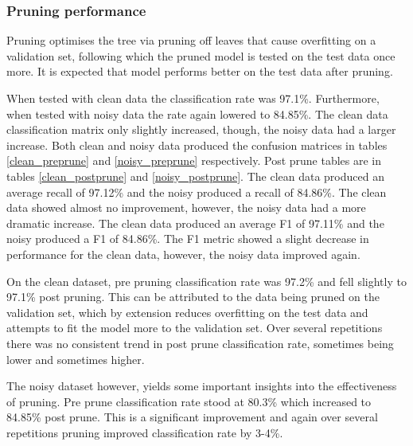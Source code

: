 \documentclass{article}
\begin{document}
\subsubsection{Pruning performance}

Pruning optimises the tree via pruning off leaves that cause overfitting on a validation set, following which the pruned model is tested on the test data once more. It is expected that model performs better on the test data after pruning.

When tested with clean data the classification rate was 97.1\%. Furthermore, when tested with noisy data the rate again lowered to 84.85\%. The clean data classification matrix only slightly increased, though, the noisy data had a larger increase. Both clean and noisy data produced the confusion matrices in tables \ref{clean_preprune} and \ref{noisy_preprune} respectively. Post prune tables are in tables \ref{clean_postprune} and \ref{noisy_postprune}. The clean data produced an average recall of 97.12\% and the noisy produced a recall of 84.86\%. The clean data showed almost no improvement, however, the noisy data had a more dramatic increase. The clean data produced an average F1 of 97.11\% and the noisy produced a F1 of 84.86\%. The F1 metric showed a slight decrease in performance for the clean data, however, the noisy data improved again.

On the clean dataset, pre pruning classification rate was 97.2\% and fell slightly to 97.1\% post pruning. This can be attributed to the data being pruned on the validation set, which by extension reduces overfitting on the test data and attempts to fit the model more to the validation set. Over several repetitions there was no consistent trend in post prune classification rate, sometimes being lower and sometimes higher.

The noisy dataset however, yields some important insights into the effectiveness of pruning. Pre prune classification rate stood at 80.3\% which increased to 84.85\% post prune. This is a significant improvement and again over several repetitions pruning improved classification rate by 3-4\%.
\end{document}
